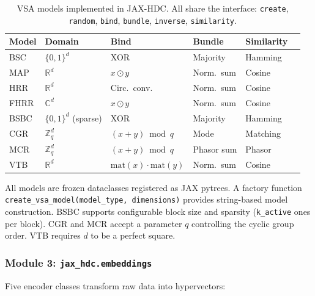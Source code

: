 \documentclass[twoside,11pt]{article}
\begin{document}
\begin{table}[t]
\centering
\caption{VSA models implemented in JAX-HDC. All share the interface: \texttt{create}, \texttt{random}, \texttt{bind}, \texttt{bundle}, \texttt{inverse}, \texttt{similarity}.}
\label{tab:models}
\begin{tabular}{llllll}
\toprule
\textbf{Model} & \textbf{Domain} & \textbf{Bind} & \textbf{Bundle} & \textbf{Similarity} \\
\midrule
BSC & $\{0,1\}^d$ & XOR & Majority & Hamming \\
MAP & $\mathbb{R}^d$ & $x \odot y$ & Norm.\ sum & Cosine \\
HRR & $\mathbb{R}^d$ & Circ.\ conv. & Norm.\ sum & Cosine \\
FHRR & $\mathbb{C}^d$ & $x \odot y$ & Norm.\ sum & Cosine \\
BSBC & $\{0,1\}^d$ (sparse) & XOR & Majority & Hamming \\
CGR & $\mathbb{Z}_q^d$ & $(x+y) \bmod q$ & Mode & Matching \\
MCR & $\mathbb{Z}_q^d$ & $(x+y) \bmod q$ & Phasor sum & Phasor \\
VTB & $\mathbb{R}^d$ & $\text{mat}(x) \cdot \text{mat}(y)$ & Norm.\ sum & Cosine \\
\bottomrule
\end{tabular}
\end{table}

All models are frozen dataclasses registered as JAX pytrees. A factory function \texttt{create\_vsa\_model(model\_type, dimensions)} provides string-based model construction. BSBC supports configurable block size and sparsity (\texttt{k\_active} ones per block). CGR and MCR accept a parameter $q$ controlling the cyclic group order. VTB requires $d$ to be a perfect square.

\subsubsection{Module 3: \texttt{jax\_hdc.embeddings}}

Five encoder classes transform raw data into hypervectors:
\end{document}
